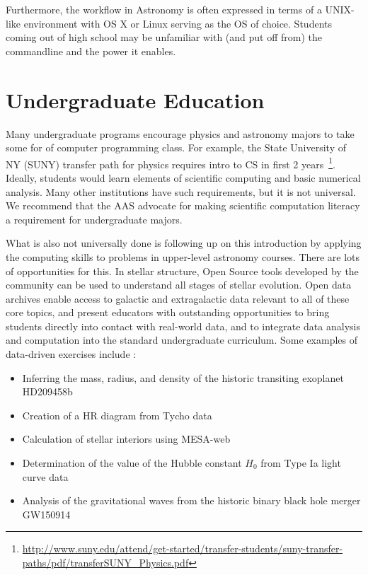 \documentclass[11pt]{article}
\newenvironment{squishlist}                                                     
  {\begin{itemize}                                                              
    \addtolength{\itemsep}{-0.33\baselineskip}                                  
   }                                                                            
  { \end{itemize} }
\begin{document}
Furthermore, the workflow in Astronomy is often expressed in terms of
a UNIX-like environment with OS X or Linux serving as the OS of
choice.  Students coming out of high school may be unfamiliar with
(and put off from) the commandline and the power it enables.

\section{Undergraduate Education}

Many undergraduate programs encourage physics and astronomy majors to
take some for of computer programming class.  For example, the State
University of NY (SUNY) transfer path for physics requires intro to CS
in first 2
years~\footnote{\url{http://www.suny.edu/attend/get-started/transfer-students/suny-transfer-paths/pdf/transferSUNY_Physics.pdf}}.
Ideally, students would learn elements of scientific computing and
basic numerical analysis.  Many other institutions have such
requirements, but it is not universal.  We recommend that the AAS
advocate for making scientific computation literacy a requirement for
undergraduate majors.

What is also not universally done is following up on this introduction
by applying the computing skills to problems in upper-level astronomy
courses.  There are lots of opportunities for this.  In stellar
structure, Open Source tools developed by the community can be used to
understand all stages of stellar evolution. Open data archives enable
access to galactic and extragalactic data relevant to all of these
core topics, and present educators with outstanding opportunities to
bring students directly into contact with real-world data, and to
integrate data analysis and computation into the standard
undergraduate curriculum. Some examples of data-driven exercises
include :
\begin {squishlist}

\item Inferring the mass, radius, and density of the historic transiting exoplanet HD209458b

\item Creation of a HR diagram from Tycho data

\item Calculation of stellar interiors using MESA-web

\item Determination of the value of the Hubble constant $H_0$ from Type Ia light curve data

\item Analysis of the gravitational waves from the historic binary black hole merger GW150914

\end {squishlist}
\end{document}
